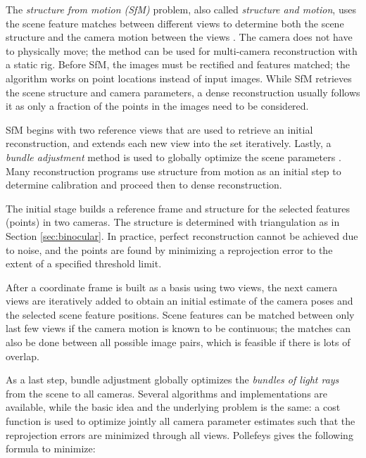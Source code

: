 The \emph{structure from motion (SfM)} problem, also called \emph{structure and motion}, uses the scene feature matches between different views to determine both the scene structure and the camera motion between the views \cite{snavely2006photo,fitzgibbon1998automatic,pollefeys2004visual}.
The camera does not have to physically move; the method can be used for multi-camera reconstruction with a static rig.
Before SfM, the images must be rectified and features matched; the algorithm works on point locations instead of input images.
While SfM retrieves the scene structure and camera parameters, a dense reconstruction usually follows it as only a fraction of the points in the images need to be considered. \cite{pollefeys2004visual}

SfM begins with two reference views that are used to retrieve an initial reconstruction, and extends each new view into the set iteratively.
Lastly, a \emph{bundle adjustment} method is used to globally optimize the scene parameters \cite{triggs2000bundle}.
Many reconstruction programs use structure from motion as an initial step to determine calibration and proceed then to dense reconstruction.

The initial stage builds a reference frame and structure for the selected features (points) in two cameras.
The structure is determined with triangulation as in Section \ref{sec:binocular}.
In practice, perfect reconstruction cannot be achieved due to noise, and the points are found by minimizing a reprojection error to the extent of a specified threshold limit.

After a coordinate frame is built as a basis using two views, the next camera views are iteratively added to obtain an initial estimate of the camera poses and the selected scene feature positions.
Scene features can be matched between only last few views if the camera motion is known to be continuous;
the matches can also be done between all possible image pairs, which is feasible if there is lots of overlap.

As a last step, bundle adjustment globally optimizes the \emph{bundles of light rays} from the scene to all cameras.
Several algorithms and implementations are available, while the basic idea and the underlying problem is the same:
a cost function is used to optimize jointly all camera parameter estimates such that the reprojection errors are minimized through all views.
Pollefeys \cite{pollefeys2004visual} gives the following formula to minimize:


